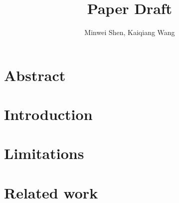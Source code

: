 \documentclass[letterpaper,twocolumn,10pt]{article}
\title{Paper Draft}
\author{Minwei Shen, Kaiqiang Wang}
\affil{School of Computing, University of Utah}
\begin{document}
\maketitle

\section{Abstract}


\section{Introduction}


\section{Limitations}


\section{Related work}

 
 
 
  \small 
  
  
\end{document}
